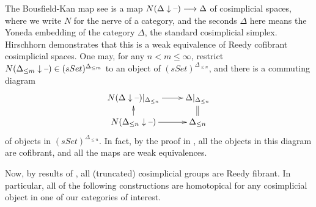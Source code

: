 \documentclass[10pt]{article}
\renewcommand{\Set}{Set}
\newcommand{\TruncSimplex}[1]{{\Delta_{\leq#1}}}
\begin{document}
\begin{convergence}
The Bousfield-Kan map see \cite{Hirschhorn.pdf} is a map $N(\Delta\downarrow\textup{--})\longrightarrow \Delta$ of cosimplicial spaces, where we write $N$ for the nerve of a category, and the seconds $\Delta$ here means the Yoneda embedding of the category $\Delta$, the standard cosimplicial simplex. Hirschhorn demonstrates that this is a weak equivalence of Reedy cofibrant cosimplicial spaces. One may, for any $n< m\leq\infty$, restrict $N(\TruncSimplex{m}\downarrow\DASH)\in(s\Set)^{\TruncSimplex{m}}$ to an object of $(s\Set)^\TruncSimplex{n}$, and there is a commuting diagram
\[\xymatrix@R=4mm{
N(\Delta\downarrow\DASH)|_{\TruncSimplex{n}}
\ar[r]
&%
\Delta|_{\TruncSimplex{n}}
\ar@{=}[d]\\%
N(\TruncSimplex{n}\downarrow\DASH)\ar[u]
\ar[r]
&%
\TruncSimplex{n}%
}\]
of objects in $(s\Set)^{\TruncSimplex{n}}$. In fact, by the proof in \cite{Hirschhorn.pdf}, all the objects in this diagram are cofibrant, and all the maps are weak equivalences.

Now, by results of \cite[{X.4.9}]{YellowMonster}, all (truncated) cosimplicial groups are Reedy fibrant. In particular, all of the following constructions are homotopical for any cosimplicial object in one of our categories of interest.


\end{convergence}
\end{document}
